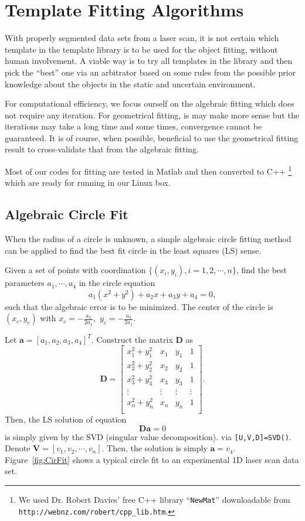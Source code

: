 \documentclass[twocolumn]{IEEEtran}
\begin{document}
\section{Template Fitting Algorithms}
\label{sec3}

With  properly segmented data sets from a laser scan,  it is not certain which   template in the template library is to be used for the object fitting, without human involvement. A viable way is to try all templates in the library and then pick the ``best'' one via an arbitrator based on some rules from the possible prior knowledge about the objects in the static and uncertain environment.

For computational efficiency, we focus ourself on the algebraic fitting which does not require any iteration. For geometrical fitting, is may make more sense but the iterations may take a long time and some times, convergence cannot be guaranteed. It is of course, when possible, beneficial to use the geometrical fitting result to cross-validate that from the algebraic fitting.

Most of our codes for fitting are tested in Matlab and then converted to C++ \footnote{We used Dr. Robert Davies' free C++ library ``\texttt{NewMat}'' downloadable from \texttt{http://webnz.com/robert/cpp\_lib.htm}.} which are ready for running in our Linux box.




\subsection{Algebraic Circle Fit}
\label{sec31}

When the radius of a circle is unknown,   a simple algebraic circle fitting method can be applied to find the best fit circle in the   least  squares (LS) sense. 

Given a set of points with coordination $\{ (x_i,y_i), i=1,2, \cdots, n\} $,   find the best parameters $a_1, \cdots, a_4$ in the circle equation
$$a_1 (x^2+y^2) + a_2 x + a_3 y +a_4=0,$$
such that
the algebraic error 
is to be  minimized. The center of the circle is $(x_c, y_c)$ with $x_c = -\frac{a_2}{2 a_1}, $ $y_c = -\frac{a_3}{2 a_1}. $

Let ${\mathbf a}= [a_{1},   a_{2},  a_{3},  a_{4}]^T$. Construct  the matrix $ \mathbf{D}$ as
\[
 \mathbf{D}=\begin{bmatrix}
  x_1^2+y_1^2 & x_1 & y_1 & 1 \\
  x_2^2+y_2^2 & x_2 & y_2 & 1 \\
  x_3^2+y_3^2 & x_3 & y_3 & 1 \\
  \vdots & \vdots& \vdots & \vdots \\
  x_n^2+y_n^2 & x_n & y_n & 1 \\
\end{bmatrix}.\]
Then, the LS   solution of equation $$\mathbf{D a}=0$$ is simply given by the 
 SVD (singular value decomposition).  
via \texttt{[U,V,D]=SVD()}. Denote $\mathbf{V}=[v_1, v_2,\cdots,v_n].$ Then, the solution is simply $\mathbf{a}=v_4$.
Figure~\ref{fig:CirFit} shows a typical circle fit to an experimental 1D laser scan data set.
\end{document}
